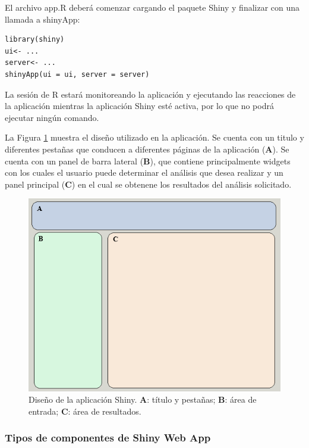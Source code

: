 El archivo app.R deberá comenzar cargando el paquete Shiny y finalizar con una llamada a shinyApp:\\

\begin{lstlisting}[frame=single]
library(shiny)
ui<- ...
server<- ...
shinyApp(ui = ui, server = server)
\end{lstlisting}

La sesión de R estará monitoreando la aplicación y ejecutando las reacciones de la aplicación mientras la aplicación Shiny esté activa, por lo que no podrá ejecutar ningún comando.

La Figura \ref{fig:fig323} muestra el diseño utilizado en la aplicación. Se cuenta con un titulo y diferentes pestañas que conducen a diferentes páginas de la aplicación (\textbf{A}). Se cuenta con un panel de barra lateral (\textbf{B}), que contiene principalmente widgets con los cuales el usuario puede determinar el análisis que desea realizar y un panel principal (\textbf{C}) en el cual se obtenene los resultados del análisis solicitado.

\begin{figure}[h]
\begin{center}
\includegraphics[width=12cm]{./Graficos/figura6}
\end{center}
\caption{Diseño de la aplicación Shiny. \textbf{A}: título y pestañas; \textbf{B}: área de entrada; \textbf{C}: área de resultados.}
\label{fig:fig323}
\end{figure}

\subsubsection{Tipos de componentes de Shiny Web App}


